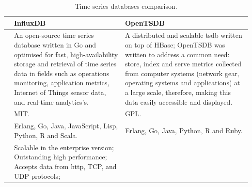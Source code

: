 \begin{table}[H]
    \caption{Time-series databases comparison.}
    \label{table:time_series_databases_comparison}
    \centering
    \begin{tabularx}{\linewidth} {
            >{\hsize=0.70\hsize}X|
            >{\hsize=1.15\hsize}X|
            >{\hsize=1.15\hsize}X|}
        \cline{2-3}

         & InfluxDB \cite{influxdb}
         & OpenTSDB \cite{opentsdb}                                                                                                                                                                                                                                       \\ \hline \hline
        \multicolumn{1}{|l|}{\textbf{Description}}
         & An open-source time series database written in Go and optimised for fast, high-availability storage and retrieval of time series data in fields such as operations monitoring, application metrics, Internet of Things sensor data, and real-time analytics's.
         & A distributed and scalable \gls{tsdb} written on top of HBase; \newline
        OpenTSDB was written to address a common need: store, index and serve metrics collected from computer systems (network gear, operating systems and applications) at a large scale, therefore, making this data easily accessible and displayed.                   \\ \hline
        \multicolumn{1}{|l|}{\textbf{Licence}~\cite{Morin2012}}
         & MIT.
         & GPL.                                                                                                                                                                                                                                                           \\ \hline
        \multicolumn{1}{|p{2cm}|}{\textbf{Supported languages}}
         & Erlang, Go, Java, JavaScript, Lisp, Python, R and Scala.
         & Erlang, Go, Java, Python, R and Ruby.                                                                                                                                                                                                                          \\ \hline
        \multicolumn{1}{|l|}{\textbf{Pros}}
         & Scalable in the enterprise version; \newline
        Outstanding high performance; \newline
        Accepts data from \gls{http}, TCP, and UDP protocols; \newline

\end{tabularx}
\end{table}
